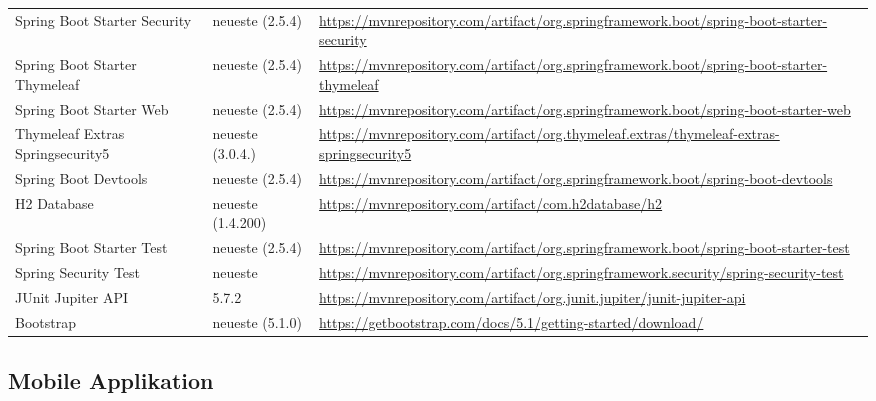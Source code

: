 {\begin{center}
\begin{longtable}[h]{p{4cm} p{2cm} p{8cm}}
    \rowcolor[HTML]{E7E7E7}
    Spring Boot Starter Security     & neueste (2.5.4)         & \url{https://mvnrepository.com/artifact/org.springframework.boot/spring-boot-starter-security}   \\
    Spring Boot Starter Thymeleaf    & neueste (2.5.4)          & \url{https://mvnrepository.com/artifact/org.springframework.boot/spring-boot-starter-thymeleaf}  \\
    \rowcolor[HTML]{E7E7E7}
    Spring Boot Starter Web          & neueste (2.5.4)         & \url{https://mvnrepository.com/artifact/org.springframework.boot/spring-boot-starter-web}        \\
    Thymeleaf Extras Springsecurity5 & neueste (3.0.4.)          & \url{https://mvnrepository.com/artifact/org.thymeleaf.extras/thymeleaf-extras-springsecurity5}   \\
    \rowcolor[HTML]{E7E7E7}
    Spring Boot Devtools             & neueste (2.5.4)         & \url{https://mvnrepository.com/artifact/org.springframework.boot/spring-boot-devtools}           \\
    H2 Database                      &  neueste (1.4.200)         & \url{https://mvnrepository.com/artifact/com.h2database/h2}                                       \\
    \rowcolor[HTML]{E7E7E7}
    Spring Boot Starter Test         & neueste (2.5.4)         & \url{https://mvnrepository.com/artifact/org.springframework.boot/spring-boot-starter-test}       \\
    Spring Security Test             & neueste          & \url{https://mvnrepository.com/artifact/org.springframework.security/spring-security-test}       \\
    \rowcolor[HTML]{E7E7E7}
    JUnit Jupiter API                & 5.7.2            & \url{https://mvnrepository.com/artifact/org.junit.jupiter/junit-jupiter-api}                     \\
    Bootstrap                        & neueste (5.1.0)   & \url{https://getbootstrap.com/docs/5.1/getting-started/download/}                                \\
\end{longtable}
\end{center}

\subsection{Mobile Applikation}

}
